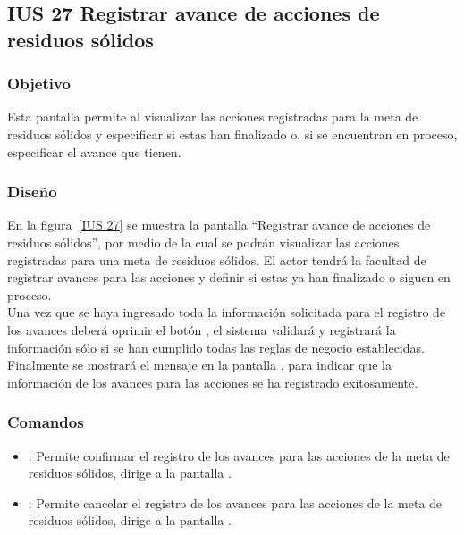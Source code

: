 \subsection{IUS 27 Registrar avance de acciones de residuos sólidos}

\subsubsection{Objetivo}

    Esta pantalla permite al  visualizar las acciones registradas para la meta de residuos sólidos y especificar si estas han finalizado o, si se encuentran en proceso, especificar el avance que tienen.
    
\subsubsection{Diseño}

        En la figura~\ref{IUS 27} se muestra la pantalla ``Registrar avance de acciones de residuos sólidos'', por medio de la cual se podrán visualizar las acciones registradas para una meta de residuos sólidos. El actor tendrá la facultad de registrar avances para las acciones y definir si estas ya han finalizado o siguen en proceso.\\
        
        Una vez que se haya ingresado toda la información solicitada para el registro de los avances deberá oprimir el botón , el sistema validará y registrará la información sólo si se han cumplido todas las reglas de negocio establecidas.\\
    
      Finalmente se mostrará el mensaje  en la pantalla , para indicar que la información de los avances para las acciones se ha registrado exitosamente.
        


\subsubsection{Comandos}
    \begin{itemize}	
	\item {}: Permite confirmar el registro de los avances para las acciones de la meta de residuos sólidos, dirige a la pantalla .
	\item {}: Permite cancelar el registro de los avances para las acciones de la meta de residuos sólidos, dirige a la pantalla .
    \end{itemize}

